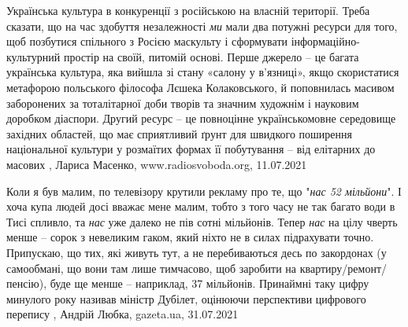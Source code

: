 Українська культура в конкуренції з російською на власній території.  Треба
сказати, що на час здобуття незалежності \emph{ми} мали два потужні ресурси для
того, щоб позбутися спільного з Росією маскульту і сформувати
інформаційно-культурний простір на своїй, питомій основі.  Перше джерело – це
багата українська культура, яка вийшла зі стану «салону у в’язниці», якщо
скористатися метафорою польського філософа Лєшека Колаковського, й поповнилась
масивом заборонених за тоталітарної доби творів та значним художнім і науковим
доробком діаспори.  Другий ресурс – це повноцінне українськомовне середовище
західних областей, що має сприятливий ґрунт для швидкого поширення національної
культури у розмаїтих формах її побутування – від елітарних до масових
, 
Лариса Масенко, www.radiosvoboda.org, 11.07.2021

Коли я був малим, по телевізору крутили рекламу про те, що "\emph{нас 52 мільйони}". І
хоча купа людей досі вважає мене малим, тобто з того часу не так багато води в
Тисі спливло, та \emph{нас} уже далеко не пів сотні мільйонів.  Тепер \emph{нас} на цілу
чверть менше – сорок з невеликим гаком, який ніхто не в силах підрахувати
точно. Припускаю, що тих, які живуть тут, а не перебиваються десь по закордонах
(у самообмані, що вони там лише тимчасово, щоб заробити на
квартиру/ремонт/пенсію), буде ще менше – наприклад, 37 мільйонів. Принаймні
таку цифру минулого року називав міністр Дубілет, оцінюючи перспективи
цифрового перепису
, 
Андрій Любка, gazeta.ua, 31.07.2021
